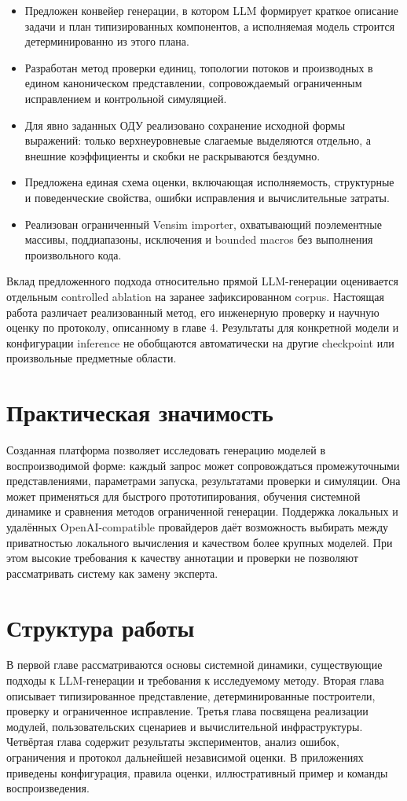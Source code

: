 \begin{itemize}
    \item Предложен конвейер генерации, в котором LLM формирует краткое описание задачи и план типизированных компонентов, а исполняемая модель строится детерминированно из этого плана.
    \item Разработан метод проверки единиц, топологии потоков и производных в едином каноническом представлении, сопровождаемый ограниченным исправлением и контрольной симуляцией.
    \item Для явно заданных ОДУ реализовано сохранение исходной формы выражений: только верхнеуровневые слагаемые выделяются отдельно, а внешние коэффициенты и скобки не раскрываются бездумно.
    \item Предложена единая схема оценки, включающая исполняемость, структурные и поведенческие свойства, ошибки исправления и вычислительные затраты.
    \item Реализован ограниченный Vensim importer, охватывающий поэлементные массивы, поддиапазоны, исключения и bounded macros без выполнения произвольного кода.
\end{itemize}

Вклад предложенного подхода относительно прямой LLM-генерации оценивается отдельным controlled ablation на заранее зафиксированном corpus. Настоящая работа различает реализованный метод, его инженерную проверку и научную оценку по протоколу, описанному в главе 4. Результаты для конкретной модели и конфигурации inference не обобщаются автоматически на другие checkpoint или произвольные предметные области.

\section*{Практическая значимость}

Созданная платформа позволяет исследовать генерацию моделей в воспроизводимой форме: каждый запрос может сопровождаться промежуточными представлениями, параметрами запуска, результатами проверки и симуляции. Она может применяться для быстрого прототипирования, обучения системной динамике и сравнения методов ограниченной генерации. Поддержка локальных и удалённых OpenAI-compatible провайдеров даёт возможность выбирать между приватностью локального вычисления и качеством более крупных моделей. При этом высокие требования к качеству аннотации и проверки не позволяют рассматривать систему как замену эксперта.

\section*{Структура работы}

В первой главе рассматриваются основы системной динамики, существующие подходы к LLM-генерации и требования к исследуемому методу. Вторая глава описывает типизированное представление, детерминированные построители, проверку и ограниченное исправление. Третья глава посвящена реализации модулей, пользовательских сценариев и вычислительной инфраструктуры. Четвёртая глава содержит результаты экспериментов, анализ ошибок, ограничения и протокол дальнейшей независимой оценки. В приложениях приведены конфигурация, правила оценки, иллюстративный пример и команды воспроизведения.
